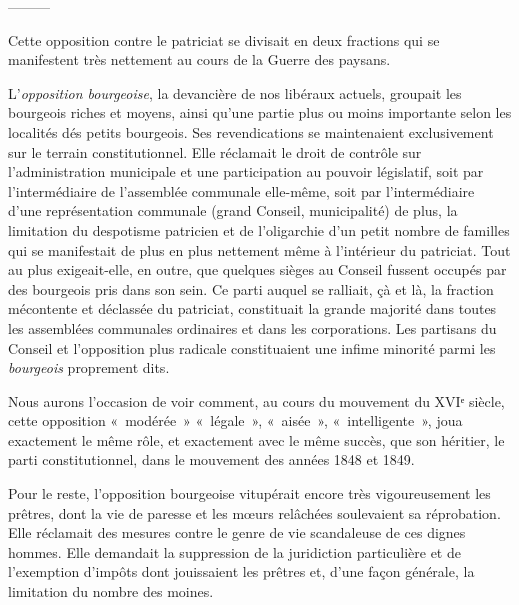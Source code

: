 \documentclass[french,twoside]{book} %
\begin{document}
———\par
\noindent Cette opposition contre le patriciat se divisait en deux fractions qui se manifestent très nettement au cours de la Guerre des paysans.\par
L’\emph{opposition bourgeoise}, la devancière de nos libéraux actuels, groupait les bourgeois riches et moyens, ainsi qu’une partie plus ou moins importante selon les localités dés petits bourgeois. Ses revendications se maintenaient exclusivement sur le terrain constitutionnel. Elle réclamait le droit de contrôle sur l’administration municipale et une participation au pouvoir législatif, soit par l’intermédiaire de l’assemblée communale elle-même, soit par l’intermédiaire d’une représentation communale (grand Conseil, municipalité) de plus, la limitation du despotisme patricien et de l’oligarchie d’un petit nombre de familles qui se manifestait de plus en plus nettement même à l’intérieur du patriciat. Tout au plus exigeait-elle, en outre, que quelques sièges au Conseil fussent occupés par des bourgeois pris dans son sein. Ce parti auquel se ralliait, çà et là, la fraction mécontente et déclassée du patriciat, constituait la grande majorité dans toutes les assemblées communales ordinaires et dans les corporations. Les partisans du Conseil et l’opposition plus radicale constituaient une infime minorité parmi les \emph{bourgeois} proprement dits.\par
Nous aurons l’occasion de voir comment, au cours du mouvement du XVIᵉ siècle, cette opposition « modérée » « légale », « aisée », « intelligente », joua exactement le même rôle, et exactement avec le même succès, que son héritier, le parti constitutionnel, dans le mouvement des années 1848 et 1849.\par
Pour le reste, l’opposition bourgeoise vitupérait encore très vigoureusement les prêtres, dont la vie de paresse et les mœurs relâchées soulevaient sa réprobation. Elle réclamait des mesures contre le genre de vie scandaleuse de ces dignes hommes. Elle demandait la suppression de la juridiction particulière et de l’exemption d’impôts dont jouissaient les prêtres et, d’une façon générale, la limitation du nombre des moines.\par
\end{document}
